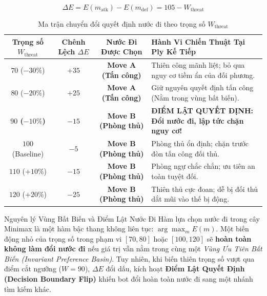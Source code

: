 \documentclass[11pt,a4paper]{article}
\begin{document}
\begin{equation}
\Delta E = E(m_{\text{atk}}) - E(m_{\text{def}}) = 105 - W_{\text{threat}}
\label{eq:delta_e}
\end{equation}

\begin{table}[htbp]
\centering
\small
\caption{Ma trận chuyển đổi quyết định nước đi theo trọng số $W_{\text{threat}}$}
\label{tab:decision_boundary}
\begin{tabularx}{\textwidth}{c c c X}
\toprule
\textbf{Trọng số $W_{\text{threat}}$} & \textbf{Chênh Lệch $\Delta E$} & \textbf{Nước Đi Được Chọn} & \textbf{Hành Vi Chiến Thuật Tại Ply Kế Tiếp} \\
\midrule
$70$ ($-30\%$) & $+35$ & \textbf{Move A (Tấn công)} & Thiên công mãnh liệt; bỏ qua nguy cơ tiềm ẩn của đối phương. \\
$80$ ($-20\%$) & $+25$ & \textbf{Move A (Tấn công)} & Giữ nguyên quyết định tấn công (Nằm trong vùng bất biến). \\
\midrule
\textbf{$90$ ($-10\%$)} & \textbf{$-15$} & \textbf{Move B (Phòng thủ)} & \textbf{ĐIỂM LẬT QUYẾT ĐỊNH: Đổi nước đi, lập tức chặn nguy cơ!} \\
$100$ (Baseline) & $-5$ & \textbf{Move B (Phòng thủ)} & Phòng thủ ổn định; chặn trước đòn tấn công đối thủ. \\
$110$ ($+10\%$) & $-15$ & \textbf{Move B (Phòng thủ)} & Phòng ngự chắc chắn; ưu tiên an toàn tuyệt đối. \\
$120$ ($+20\%$) & $-25$ & \textbf{Move B (Phòng thủ)} & Thiên thủ cực đoan; dễ bị đối thủ dắt mũi vào thế bị động. \\
\bottomrule
\end{tabularx}
\end{table}

\begin{principlebox}{Nguyên lý Vùng Bất Biến và Điểm Lật Nước Đi}
Hàm lựa chọn nước đi trong cây Minimax là một hàm bậc thang không liên tục: $\arg\max_{m} E(m)$. Một biến động nhỏ của trọng số trong phạm vi $[70, 80]$ hoặc $[100, 120]$ sẽ \textbf{hoàn toàn không làm đổi nước đi} nếu giá trị vẫn nằm trong cùng một \textit{Vùng Ưu Tiên Bất Biến (Invariant Preference Basin)}. Tuy nhiên, khi biến thiên trọng số vượt qua điểm cắt ngưỡng ($W = 90$), $\Delta E$ đổi dấu, kích hoạt \textbf{Điểm Lật Quyết Định (Decision Boundary Flip)} khiến bot đổi hoàn toàn nước đi sang một nhánh tìm kiếm khác.
\end{principlebox}

\end{document}
